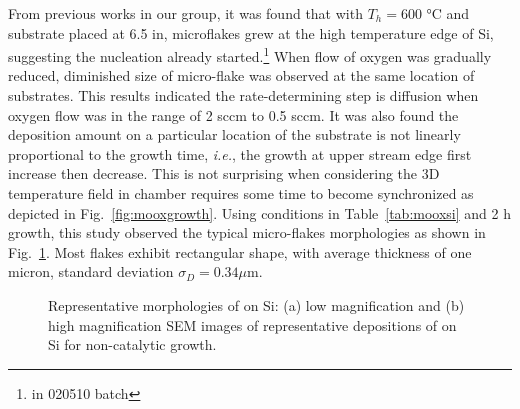 From previous works in our group,\cite{predeep2011} it was found that with $T_h = 600$ \si{\degreeCelsius} and substrate placed at 6.5 in, microflakes grew at the high temperature edge of Si, suggesting the nucleation already started.\footnote{in 020510 batch} When flow of oxygen was gradually reduced, diminished size of micro-flake was observed at the same location of substrates. This results indicated the rate-determining step is diffusion when oxygen flow was in the range of 2 sccm to 0.5 sccm. It was also found the deposition amount on a particular location of the substrate is not linearly proportional to the growth time, \emph{i.e.}, the growth at upper stream edge first increase then decrease. This is not surprising when considering the 3D temperature field in chamber requires some time to become synchronized as depicted in Fig.~\ref{fig:mooxgrowth}. Using conditions in Table~\ref{tab:mooxsi} and 2 h growth, this study observed the typical micro-flakes morphologies as shown in Fig.~\ref{fig:mosisem}. Most flakes exhibit rectangular shape, with average thickness of one micron, standard deviation $\sigma_D=0.34 \mu$m.
\begin{figure}[htb]
\centering
{}\hspace{0.04\textwidth}
\caption[Representative morphologies of  on Si]{Representative morphologies of  on Si: (a) low magnification and (b) high magnification SEM images of representative depositions of  on Si for non-catalytic growth.}
\label{fig:mosisem}
\end{figure}

